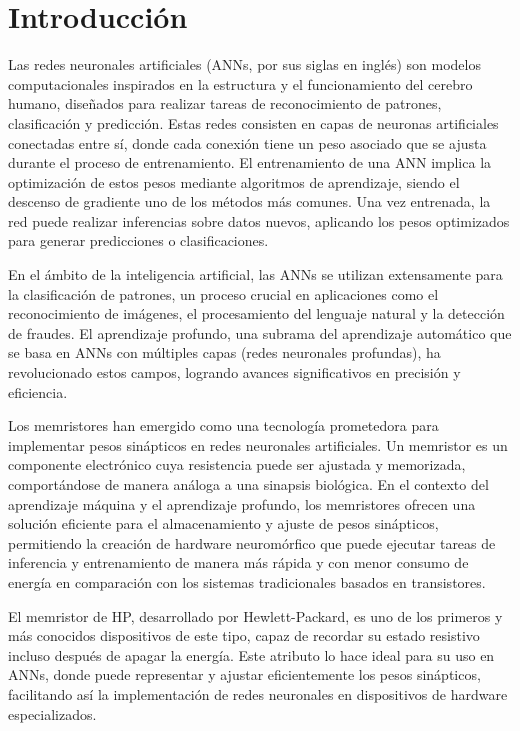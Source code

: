 \documentclass[conference]{IEEEtran}
\begin{document}
\section{Introducción}
Las redes neuronales artificiales (ANNs, por sus siglas en inglés) son modelos computacionales inspirados en la estructura y el funcionamiento del cerebro humano, diseñados para realizar tareas de reconocimiento de patrones, clasificación y predicción. Estas redes consisten en capas de neuronas artificiales conectadas entre sí, donde cada conexión tiene un peso asociado que se ajusta durante el proceso de entrenamiento. El entrenamiento de una ANN implica la optimización de estos pesos mediante algoritmos de aprendizaje, siendo el descenso de gradiente uno de los métodos más comunes. Una vez entrenada, la red puede realizar inferencias sobre datos nuevos, aplicando los pesos optimizados para generar predicciones o clasificaciones.

En el ámbito de la inteligencia artificial, las ANNs se utilizan extensamente para la clasificación de patrones, un proceso crucial en aplicaciones como el reconocimiento de imágenes, el procesamiento del lenguaje natural y la detección de fraudes. El aprendizaje profundo, una subrama del aprendizaje automático que se basa en ANNs con múltiples capas (redes neuronales profundas), ha revolucionado estos campos, logrando avances significativos en precisión y eficiencia.

Los memristores han emergido como una tecnología prometedora para implementar pesos sinápticos en redes neuronales artificiales. Un memristor es un componente electrónico cuya resistencia puede ser ajustada y memorizada, comportándose de manera análoga a una sinapsis biológica. En el contexto del aprendizaje máquina y el aprendizaje profundo, los memristores ofrecen una solución eficiente para el almacenamiento y ajuste de pesos sinápticos, permitiendo la creación de hardware neuromórfico que puede ejecutar tareas de inferencia y entrenamiento de manera más rápida y con menor consumo de energía en comparación con los sistemas tradicionales basados en transistores.

El memristor de HP, desarrollado por Hewlett-Packard, es uno de los primeros y más conocidos dispositivos de este tipo, capaz de recordar su estado resistivo incluso después de apagar la energía. Este atributo lo hace ideal para su uso en ANNs, donde puede representar y ajustar eficientemente los pesos sinápticos, facilitando así la implementación de redes neuronales en dispositivos de hardware especializados.
\end{document}
